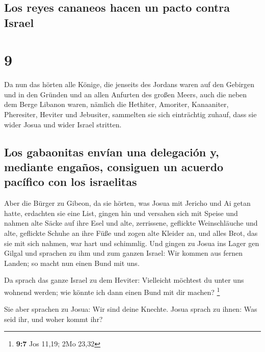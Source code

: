 \hypertarget{los-reyes-cananeos-hacen-un-pacto-contra-israel}{%
\subsection{Los reyes cananeos hacen un pacto contra
Israel}\label{los-reyes-cananeos-hacen-un-pacto-contra-israel}}

\hypertarget{section-8}{%
\section{9}\label{section-8}}

 Da nun das hörten alle Könige, die jenseits des Jordans
waren auf den Gebirgen und in den Gründen und an allen Anfurten des
großen Meers, auch die neben dem Berge Libanon waren, nämlich die
Hethiter, Amoriter, Kanaaniter, Pheresiter, Heviter und Jebusiter,
 sammelten sie sich einträchtig zuhauf, dass sie wider
Josua und wider Israel stritten.

\hypertarget{los-gabaonitas-envuxedan-una-delegaciuxf3n-y-mediante-engauxf1os-consiguen-un-acuerdo-pacuxedfico-con-los-israelitas}{%
\subsection{Los gabaonitas envían una delegación y, mediante engaños,
consiguen un acuerdo pacífico con los
israelitas}\label{los-gabaonitas-envuxedan-una-delegaciuxf3n-y-mediante-engauxf1os-consiguen-un-acuerdo-pacuxedfico-con-los-israelitas}}

 Aber die Bürger zu Gibeon, da sie hörten, was Josua mit
Jericho und Ai getan hatte, erdachten sie eine List, 
gingen hin und versahen sich mit Speise und nahmen alte Säcke auf ihre
Esel  und alte, zerrissene, geflickte Weinschläuche und
alte, geflickte Schuhe an ihre Füße und zogen alte Kleider an, und alles
Brot, das sie mit sich nahmen, war hart und schimmlig. 
Und gingen zu Josua ins Lager gen Gilgal und sprachen zu ihm und zum
ganzen Israel: Wir kommen aus fernen Landen; so macht nun einen Bund mit
uns.

 Da sprach das ganze Israel zu dem Heviter: Vielleicht
möchtest du unter uns wohnend werden; wie könnte ich dann einen Bund mit
dir machen? \footnote{\textbf{9:7} Jos 11,19; 2Mo 23,32}

 Sie aber sprachen zu Josua: Wir sind deine Knechte. Josua
sprach zu ihnen: Was seid ihr, und woher kommt ihr?

